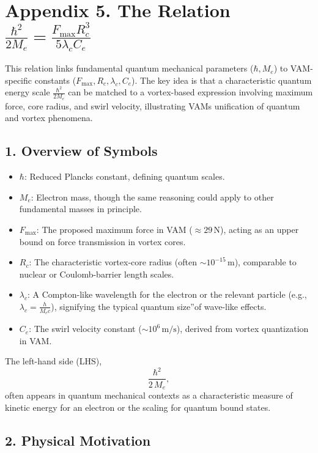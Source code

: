 

\section*{Appendix 5. The Relation \(\frac{\hbar^2}{2 M_e} = \frac{F_{\max} R_c^3}{5  \lambda_c  C_e} \)}

This relation links fundamental quantum mechanical parameters (\(\hbar, M_e\)) to VAM-specific constants (\(F_{\max}, R_c, \lambda_c, C_e\)). The key idea is that a characteristic quantum energy scale \(\tfrac{\hbar^2}{2M_e}\) can be matched to a vortex-based expression involving maximum force, core radius, and swirl velocity, illustrating VAM\rqs s unification of quantum and vortex phenomena.

\subsection*{1. Overview of Symbols}

\begin{itemize}
    \item \(\hbar\): Reduced Planck\rqs s constant, defining quantum scales.
    \item \(M_e\): Electron mass, though the same reasoning could apply to other fundamental masses in principle.
    \item \(F_{\max}\): The proposed maximum force in VAM (\(\approx 29\,\mathrm{N}\)), acting as an upper bound on force transmission in vortex cores.
    \item \(R_c\): The characteristic vortex-core radius (often \(\sim 10^{-15}\,\mathrm{m}\)), comparable to nuclear or Coulomb-barrier length scales.
    \item \(\lambda_c\): A Compton-like wavelength for the electron or the relevant particle (e.g., \(\lambda_c = \tfrac{h}{M_e c}\)), signifying the typical quantum \grqq size\textquotedblright of wave-like effects.
    \item \(C_e\): The swirl velocity constant (\(\sim 10^6\,\mathrm{m/s}\)), derived from vortex quantization in VAM.
\end{itemize}

The left-hand side (LHS),
\[
    \frac{\hbar^2}{2\,M_e},
\]
often appears in quantum mechanical contexts as a characteristic measure of kinetic energy for an electron or the scaling for quantum bound states.

\subsection*{2. Physical Motivation}

